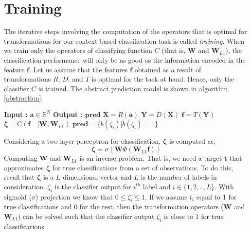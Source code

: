 \section{Training}
\label{training}
The iterative steps involving the computation of the operators that is optimal for transformations for our context-based classification task is called \textit{training}. When we train only the operators of classifying function $C$ (that is, $\textbf{W}$ and $\textbf{W}_{L1}$), the classification performance will only be as good as the information encoded in the feature $\textbf{f}$. Let us assume that the features $\textbf{f}$ obtained as a result of transformations $R$, $D$, and $T$ is optimal for the task at hand. Hence, only the classifier $C$ is trained. The abstract prediction model is shown in algorithm \ref{abstraction}.
\begin{algorithm}
  \caption{$\textbf{pred}$ = $Model$($\textbf{a}$) }\label{abstraction}
  \begin{algorithmic}[1]
    \Statex \textbf{Input :} $\textbf{a} \in \mathbb{R}^{N}$
    \Statex \textbf{Output :} $\textbf{pred}$ 
    \State $\textbf{X} = R(\textbf{a})$ 
    \State $\textbf{Y} = D(\textbf{X})$ 
    \State $\textbf{f} = T(\textbf{Y})$ 
    \State $\bm{\zeta} = C(\textbf{f} \quad |\textbf{W},\textbf{W}_{L1})$ 
    \State $\textbf{pred} = \{ b(\zeta_{i}) | b(\zeta_{i}) = 1 \}$ 
  \end{algorithmic}
\end{algorithm}
\FloatBarrier
\noindent Considering a two layer perceptron for classification, $\bm{\zeta}$ is computed as,
\begin{equation}
\label{eq:mlp}
\bm{\zeta} = \sigma ( \textbf{W} \Phi (\textbf{W}_{L1}\textbf{f}))
\end{equation}
\noindent Computing $\textbf{W}$ and $\textbf{W}_{L1}$ is an inverse problem. That is, we need a target $\textbf{t}$ that approximates $\bm{\zeta}$ for true classifications from a set of observations. To do this, recall that $\bm{\zeta}$ is a $L$ dimensional vector and $L$ is the number of labels in consideration. $\zeta_{i}$ is the classifier output for $i^{th}$ label and $i \in \{1,2,..,L\}$. With sigmoid ($\sigma$) projection we know that $0 \leq \zeta_{i} \leq 1$. If we assume $t_{i}$ equal to 1 for true classifications and 0 for the rest, then the transformation operators ($\textbf{W}$ and $\textbf{W}_{L1}$) can be solved such that the classifier output $\zeta_{i}$ is close to 1 for true classifications.

